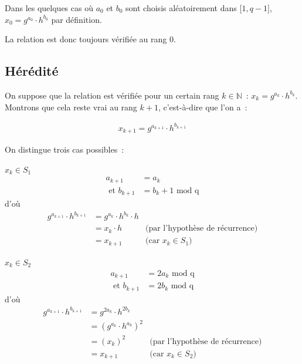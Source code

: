         Dans les quelques cas où $a_0$ et $b_0$ sont choisis aléatoirement dans $\mathopen{[}1,q-1\mathclose{]}$, $x_0 = g^{a_0} \cdot h^{b_0}$ par définition.

        La relation est donc toujours vérifiée au rang $0$.

        \subsection*{Hérédité}

        On suppose que la relation est vérifiée pour un certain rang $k \in \mathbb{N}$~: $x_k = g^{a_k} \cdot h^{b_k}$. Montrons que cela reste vrai au rang $k + 1$, c'est-à-dire que l'on a~:

        \begin{align*}
          x_{k+1} = g^{a_{k+1}} \cdot h^{b_{k+1}}
        \end{align*}

        On distingue trois cas possibles~:

        \underline{$x_{k} \in S_1$}
        \begin{align*}
          a_{k+1} &= a_k \\
          \text{\ et } b_{k+1} &= b_k + 1 \text{\ mod q}
        \end{align*}
        d'où
        \begin{align*}
          g^{a_{k+1}} \cdot h^{b_{k+1}} &= g^{a_k} \cdot h^{b_k} \cdot h \\
                                        &= x_k \cdot h & \text{(par l'hypothèse de récurrence)} \\
                                        &= x_{k+1} & \text{(car $x_k \in S_1$)}
        \end{align*}


        \underline{$x_{k} \in S_2$}
        \begin{align*}
          a_{k+1} &= 2a_k \text{\ mod q}\\
          \text{\ et } b_{k+1} &= 2b_k \text{\ mod q}
        \end{align*}
        d'où
        \begin{align*}
          g^{a_{k+1}} \cdot h^{b_{k+1}} &= g^{2a_k} \cdot h^{2b_k} \\
                                        &= {(g^{a_k} \cdot h^{a_k})}^2 \\
                                        &= {(x_k)}^2 & \text{(par l'hypothèse de récurrence)} \\
                                        &= x_{k+1} & \text{(car $x_k \in S_2$)}
        \end{align*}

